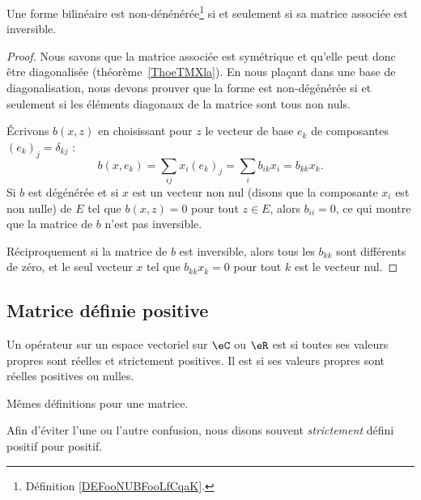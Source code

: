 \begin{proposition}     \label{PROPooQHHPooSqpgcb}
    Une forme bilinéaire est non-dénénérée\footnote{Définition \ref{DEFooNUBFooLfCqaK}.} si et seulement si sa matrice associée est inversible.
\end{proposition}

\begin{proof}
    Nous savons que la matrice associée est symétrique et qu'elle peut donc être diagonalisée (théorème~\ref{ThoeTMXla}). En nous plaçant dans une base de diagonalisation, nous devons prouver que la forme est non-dégénérée si et seulement si les éléments diagonaux de la matrice sont tous non nuls.

    Écrivons \( b(x,z)\) en choisissant pour \( z\) le vecteur de base \( e_k\) de composantes \( (e_k)_j=\delta_{kj}\) :
    \begin{equation}
            b(x,e_k)=\sum_{ij}x_i(e_k)_j
            =\sum_i b_{ik}x_i
            =b_{kk}x_k.
    \end{equation}
    Si \( b\) est dégénérée et si \( x\) est un vecteur non nul (disons que la composante \( x_i\) est non nulle) de \( E\) tel que \( b(x,z)=0\) pour tout \( z\in E\), alors \( b_{ii}=0\), ce qui montre que la matrice de \( b\) n'est pas inversible.

    Réciproquement si la matrice de \( b\) est inversible, alors tous les \( b_{kk}\) sont différents de zéro, et le seul vecteur \( x\) tel que \( b_{kk}x_k=0\) pour tout \( k\) est le vecteur nul.
\end{proof}

\subsection{Matrice définie positive}

\begin{definition}    \label{DefAWAooCMPuVM}
    Un opérateur sur un espace vectoriel sur \( \eC\) ou \( \eR\) est  si toutes ses valeurs propres sont réelles et strictement positives.  Il est  si ses valeurs propres sont réelles positives ou nulles.

    Mêmes définitions pour une matrice.
\end{definition}
Afin d'éviter l'une ou l'autre confusion, nous disons souvent \emph{strictement} défini positif pour positif.

